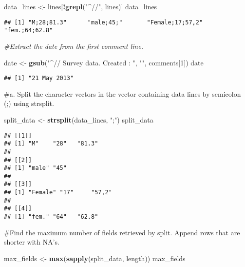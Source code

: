 \documentclass[
]{article}
\newenvironment{Shaded}{\begin{snugshade}}{\end{snugshade}}
\newcommand{\CommentTok}[1]{\textcolor[rgb]{0.56,0.35,0.01}{\textit{#1}}}
\newcommand{\DecValTok}[1]{\textcolor[rgb]{0.00,0.00,0.81}{#1}}
\newcommand{\FunctionTok}[1]{\textcolor[rgb]{0.13,0.29,0.53}{\textbf{#1}}}
\newcommand{\NormalTok}[1]{#1}
\newcommand{\OtherTok}[1]{\textcolor[rgb]{0.56,0.35,0.01}{#1}}
\newcommand{\SpecialCharTok}[1]{\textcolor[rgb]{0.81,0.36,0.00}{\textbf{#1}}}
\newcommand{\StringTok}[1]{\textcolor[rgb]{0.31,0.60,0.02}{#1}}
\begin{document}
\begin{Shaded}
\begin{Highlighting}[]
\NormalTok{data\_lines }\OtherTok{\textless{}{-}}\NormalTok{ lines[}\SpecialCharTok{!}\FunctionTok{grepl}\NormalTok{(}\StringTok{"\^{}//"}\NormalTok{, lines)]}
\NormalTok{data\_lines}
\end{Highlighting}
\end{Shaded}

\begin{verbatim}
## [1] "M;28;81.3"      "male;45;"       "Female;17;57,2" "fem.;64;62.8"
\end{verbatim}

\begin{Shaded}
\begin{Highlighting}[]
\CommentTok{\#Extract the date from the first comment line.}

\NormalTok{date }\OtherTok{\textless{}{-}} \FunctionTok{gsub}\NormalTok{(}\StringTok{"\^{}// Survey data. Created : "}\NormalTok{, }\StringTok{""}\NormalTok{, comments[}\DecValTok{1}\NormalTok{])}
\NormalTok{date}
\end{Highlighting}
\end{Shaded}

\begin{verbatim}
## [1] "21 May 2013"
\end{verbatim}

\#a. Split the character vectors in the vector containing data lines by
semicolon (;) using strsplit.

\begin{Shaded}
\begin{Highlighting}[]
\NormalTok{split\_data }\OtherTok{\textless{}{-}} \FunctionTok{strsplit}\NormalTok{(data\_lines, }\StringTok{";"}\NormalTok{)}
\NormalTok{split\_data}
\end{Highlighting}
\end{Shaded}

\begin{verbatim}
## [[1]]
## [1] "M"    "28"   "81.3"
## 
## [[2]]
## [1] "male" "45"  
## 
## [[3]]
## [1] "Female" "17"     "57,2"  
## 
## [[4]]
## [1] "fem." "64"   "62.8"
\end{verbatim}

\#Find the maximum number of fields retrieved by split. Append rows that
are shorter with NA's.

\begin{Shaded}
\begin{Highlighting}[]
\NormalTok{max\_fields }\OtherTok{\textless{}{-}} \FunctionTok{max}\NormalTok{(}\FunctionTok{sapply}\NormalTok{(split\_data, length))}
\NormalTok{max\_fields}
\end{Highlighting}
\end{Shaded}
\end{document}
